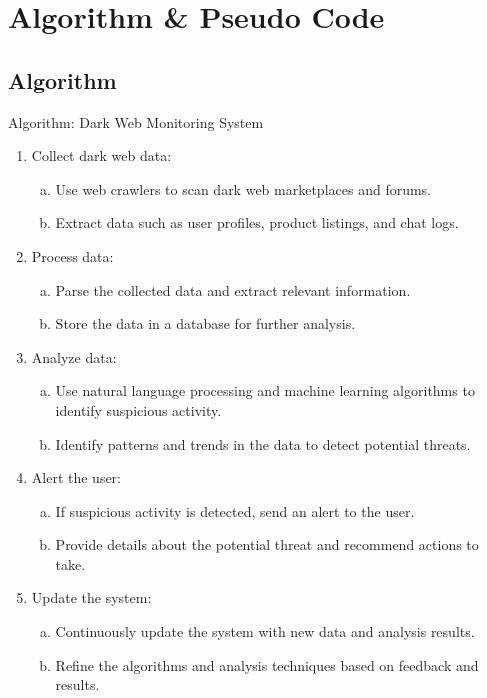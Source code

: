 \documentclass[10pt]{report}
\begin{document}
\section{Algorithm \& Pseudo Code}
\subsection{Algorithm}
Algorithm: Dark Web Monitoring System


\begin{enumerate}
    \item Collect dark web data:
    \begin{enumerate}[a)]
        \item Use web crawlers to scan dark web marketplaces and forums.
        \item Extract data such as user profiles, product listings, and chat logs.
    \end{enumerate}
    \item Process data:
    \begin{enumerate}[a)]
        \item Parse the collected data and extract relevant information.
        \item Store the data in a database for further analysis.
    \end{enumerate}
    \item Analyze data:
    \begin{enumerate}[a)]
        \item  Use natural language processing and machine learning algorithms to identify suspicious activity.
        \item Identify patterns and trends in the data to detect potential threats.
    \end{enumerate}
    \item Alert the user:
    \begin{enumerate}[a)]
        \item If suspicious activity is detected, send an alert to the user.
        \item Provide details about the potential threat and recommend actions to take.
    \end{enumerate}
    \item Update the system:
    \begin{enumerate}[a)]
        \item Continuously update the system with new data and analysis results.
        \item Refine the algorithms and analysis techniques based on feedback and results.
    \end{enumerate}
\end{enumerate}
\end{document}
